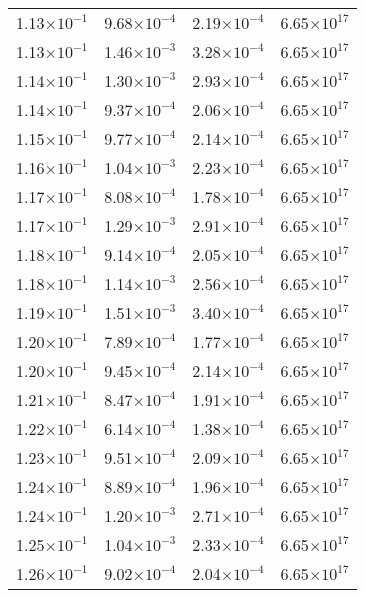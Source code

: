 \documentclass{aa}
\begin{document}
{\begin{longtable}{c|c|c|c}
1.13$\times 10^{-1}$ & 9.68$\times 10^{-4}$ & 2.19$\times 10^{-4}$ & 6.65$\times 10^{17}$  \\
1.13$\times 10^{-1}$ & 1.46$\times 10^{-3}$ & 3.28$\times 10^{-4}$ & 6.65$\times 10^{17}$  \\
1.14$\times 10^{-1}$ & 1.30$\times 10^{-3}$ & 2.93$\times 10^{-4}$ & 6.65$\times 10^{17}$  \\
1.14$\times 10^{-1}$ & 9.37$\times 10^{-4}$ & 2.06$\times 10^{-4}$ & 6.65$\times 10^{17}$  \\
1.15$\times 10^{-1}$ & 9.77$\times 10^{-4}$ & 2.14$\times 10^{-4}$ & 6.65$\times 10^{17}$  \\
1.16$\times 10^{-1}$ & 1.04$\times 10^{-3}$ & 2.23$\times 10^{-4}$ & 6.65$\times 10^{17}$  \\
1.17$\times 10^{-1}$ & 8.08$\times 10^{-4}$ & 1.78$\times 10^{-4}$ & 6.65$\times 10^{17}$  \\
1.17$\times 10^{-1}$ & 1.29$\times 10^{-3}$ & 2.91$\times 10^{-4}$ & 6.65$\times 10^{17}$  \\
1.18$\times 10^{-1}$ & 9.14$\times 10^{-4}$ & 2.05$\times 10^{-4}$ & 6.65$\times 10^{17}$  \\
1.18$\times 10^{-1}$ & 1.14$\times 10^{-3}$ & 2.56$\times 10^{-4}$ & 6.65$\times 10^{17}$  \\
1.19$\times 10^{-1}$ & 1.51$\times 10^{-3}$ & 3.40$\times 10^{-4}$ & 6.65$\times 10^{17}$  \\
1.20$\times 10^{-1}$ & 7.89$\times 10^{-4}$ & 1.77$\times 10^{-4}$ & 6.65$\times 10^{17}$  \\
1.20$\times 10^{-1}$ & 9.45$\times 10^{-4}$ & 2.14$\times 10^{-4}$ & 6.65$\times 10^{17}$  \\
1.21$\times 10^{-1}$ & 8.47$\times 10^{-4}$ & 1.91$\times 10^{-4}$ & 6.65$\times 10^{17}$  \\
1.22$\times 10^{-1}$ & 6.14$\times 10^{-4}$ & 1.38$\times 10^{-4}$ & 6.65$\times 10^{17}$  \\
1.23$\times 10^{-1}$ & 9.51$\times 10^{-4}$ & 2.09$\times 10^{-4}$ & 6.65$\times 10^{17}$  \\
1.24$\times 10^{-1}$ & 8.89$\times 10^{-4}$ & 1.96$\times 10^{-4}$ & 6.65$\times 10^{17}$  \\
1.24$\times 10^{-1}$ & 1.20$\times 10^{-3}$ & 2.71$\times 10^{-4}$ & 6.65$\times 10^{17}$  \\
1.25$\times 10^{-1}$ & 1.04$\times 10^{-3}$ & 2.33$\times 10^{-4}$ & 6.65$\times 10^{17}$  \\
1.26$\times 10^{-1}$ & 9.02$\times 10^{-4}$ & 2.04$\times 10^{-4}$ & 6.65$\times 10^{17}$  \\

\end{longtable}}
\end{document}
